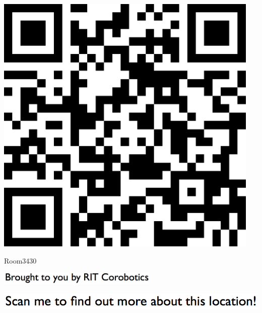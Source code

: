 \documentclass[letterpaper]{article}
\begin{document}
 \begingroup 
 \centerline{\includegraphics[scale=1,width=5in,height=5in]{Room3430.png}} 
 \endgroup 
 \vspace*{\fill} 

 \hfill{\small Room3430} 

  \vspace{0.7in} 
 
 \centerline{\includegraphics[scale=1,width=3in]{text-bottom.png}} 
 
 \pagebreak 
{} 
 \vspace*{\fill} 
 
  \centerline{\includegraphics[scale=1,width=6in]{text-top.png}} 
 
 \vspace{0.5in} 
 
\end{document}
